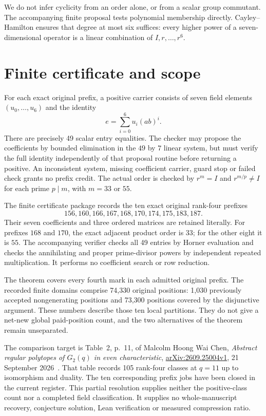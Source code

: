 \documentclass[11pt]{article}
\begin{document}
We do not infer cyclicity from an order alone, or from a scalar group
commutant. The accompanying finite proposal tests polynomial membership
directly. Cayley--Hamilton ensures that degree at most six suffices:
every higher power of a seven-dimensional operator is a linear
combination of $I,r,\ldots,r^6$.

\section{Finite certificate and scope}

For each exact original prefix, a positive carrier consists of seven
field elements $(u_0,\ldots,u_6)$ and the identity
\[
 e=\sum_{i=0}^{6}u_i(ab)^i.
\]
There are precisely 49 scalar entry equalities. The checker may propose
the coefficients by bounded elimination in the $49$ by $7$ linear
system, but must verify the full identity independently of that proposal
routine before returning a positive. An inconsistent system, missing
coefficient carrier, guard stop or failed check grants no prefix credit.
The actual order is checked by $r^m=I$ and
$r^{m/p}\ne I$ for each prime $p\mid m$, with $m=33$ or $55$.

The finite certificate package records the ten exact original rank-four prefixes
\[
156,160,166,167,168,170,174,175,183,187.
\]
Their seven coefficients and three ordered matrices are retained literally.
For prefixes $168$ and $170$, the exact adjacent product order is $33$;
for the other eight it is $55$. The accompanying verifier checks all
49 entries by Horner evaluation and checks the annihilating and proper
prime-divisor powers by independent repeated multiplication. It performs
no coefficient search or row reduction.

The theorem covers every fourth mark in each admitted original prefix.
The recorded finite domains comprise 74,330 original positions: 1,030
previously accepted nongenerating positions and 73,300 positions covered
by the disjunctive argument. These numbers describe those ten local
partitions. They do not give a net-new global paid-position count, and
the two alternatives of the theorem remain unseparated.

The comparison target is Table~2, p.~11, of Malcolm Hoong Wai Chen,
\emph{Abstract regular polytopes of $G_2(q)$ in even characteristic},
\href{https://arxiv.org/abs/2609.25004v1}{arXiv:2609.25004v1},
21 September 2026~\cite{Chen}. That table records 105 rank-four classes
at $q=11$ up to isomorphism and duality. The ten corresponding prefix jobs
have been closed in the current register. This partial resolution supplies
neither the positive-class count nor a completed field classification.
It supplies no whole-manuscript recovery, conjecture solution, Lean
verification or measured compression ratio.
\end{document}
